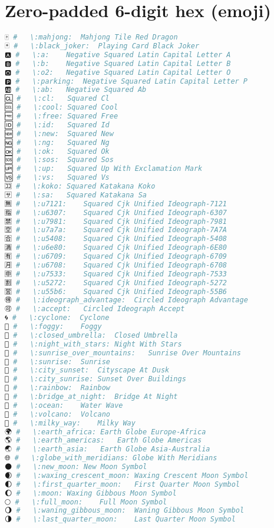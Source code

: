 \section{Zero-padded 6-digit hex (emoji)}
\begin{lstlisting}[language=Julia]
🀄 #   \:mahjong:  Mahjong Tile Red Dragon
🃏 #   \:black_joker:  Playing Card Black Joker
🅰 #   \:a:    Negative Squared Latin Capital Letter A
🅱 #   \:b:    Negative Squared Latin Capital Letter B
🅾 #   \:o2:   Negative Squared Latin Capital Letter O
🅿 #   \:parking:  Negative Squared Latin Capital Letter P
🆎 #   \:ab:   Negative Squared Ab
🆑 #   \:cl:   Squared Cl
🆒 #   \:cool: Squared Cool
🆓 #   \:free: Squared Free
🆔 #   \:id:   Squared Id
🆕 #   \:new:  Squared New
🆖 #   \:ng:   Squared Ng
🆗 #   \:ok:   Squared Ok
🆘 #   \:sos:  Squared Sos
🆙 #   \:up:   Squared Up With Exclamation Mark
🆚 #   \:vs:   Squared Vs
🈁 #   \:koko: Squared Katakana Koko
🈂 #   \:sa:   Squared Katakana Sa
🈚 #   \:u7121:    Squared Cjk Unified Ideograph-7121
🈯 #   \:u6307:    Squared Cjk Unified Ideograph-6307
🈲 #   \:u7981:    Squared Cjk Unified Ideograph-7981
🈳 #   \:u7a7a:    Squared Cjk Unified Ideograph-7A7A
🈴 #   \:u5408:    Squared Cjk Unified Ideograph-5408
🈵 #   \:u6e80:    Squared Cjk Unified Ideograph-6E80
🈶 #   \:u6709:    Squared Cjk Unified Ideograph-6709
🈷 #   \:u6708:    Squared Cjk Unified Ideograph-6708
🈸 #   \:u7533:    Squared Cjk Unified Ideograph-7533
🈹 #   \:u5272:    Squared Cjk Unified Ideograph-5272
🈺 #   \:u55b6:    Squared Cjk Unified Ideograph-55B6
🉐 #   \:ideograph_advantage:  Circled Ideograph Advantage
🉑 #   \:accept:   Circled Ideograph Accept
🌀 #   \:cyclone:  Cyclone
🌁 #   \:foggy:    Foggy
🌂 #   \:closed_umbrella:  Closed Umbrella
🌃 #   \:night_with_stars: Night With Stars
🌄 #   \:sunrise_over_mountains:   Sunrise Over Mountains
🌅 #   \:sunrise:  Sunrise
🌆 #   \:city_sunset:  Cityscape At Dusk
🌇 #   \:city_sunrise: Sunset Over Buildings
🌈 #   \:rainbow:  Rainbow
🌉 #   \:bridge_at_night:  Bridge At Night
🌊 #   \:ocean:    Water Wave
🌋 #   \:volcano:  Volcano
🌌 #   \:milky_way:    Milky Way
🌍 #   \:earth_africa: Earth Globe Europe-Africa
🌎 #   \:earth_americas:   Earth Globe Americas
🌏 #   \:earth_asia:   Earth Globe Asia-Australia
🌐 #   \:globe_with_meridians: Globe With Meridians
🌑 #   \:new_moon: New Moon Symbol
🌒 #   \:waxing_crescent_moon: Waxing Crescent Moon Symbol
🌓 #   \:first_quarter_moon:   First Quarter Moon Symbol
🌔 #   \:moon: Waxing Gibbous Moon Symbol
🌕 #   \:full_moon:    Full Moon Symbol
🌖 #   \:waning_gibbous_moon:  Waning Gibbous Moon Symbol
🌗 #   \:last_quarter_moon:    Last Quarter Moon Symbol

\end{lstlisting}
